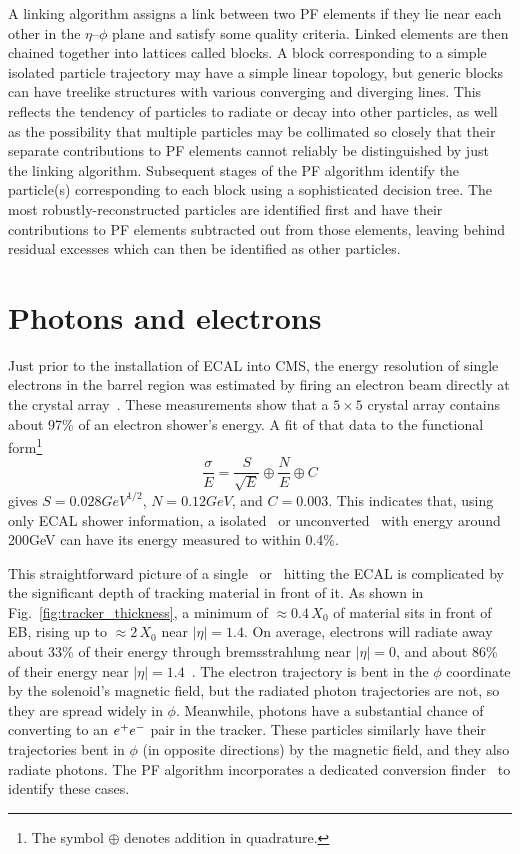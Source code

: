 \documentclass[oneside, letterpaper, 12pt, oldfontcommands]{memoir}
\begin{document}
A linking algorithm assigns a link between two PF elements if they lie near each other in the $\eta$--$\phi$ plane and satisfy some quality criteria.
Linked elements are then chained together into lattices called blocks. A block corresponding to a simple isolated particle trajectory
may have a simple linear topology, but generic blocks can have treelike structures with various converging and diverging lines.
This reflects the tendency of particles to radiate or decay into other
particles, as well as the possibility that multiple particles may be collimated so closely that their separate contributions to PF elements cannot
reliably be distinguished by just the linking algorithm. Subsequent stages of the PF algorithm identify the particle(s) corresponding to each
block using a sophisticated decision tree. The most robustly-reconstructed particles are identified first and have their contributions to PF elements
subtracted out from those elements, leaving behind residual excesses which can then be identified as other particles.

\section{Photons and electrons} \label{sec:reconstruction_egamma}
Just prior to the installation of ECAL into CMS, the energy resolution of single electrons in the barrel region was estimated
by firing an electron beam directly at the crystal array~\cite{ref:1748-0221/2/04/P04004}.
These measurements show that a $5{\times}5$ crystal array contains about 97\% of an electron shower's energy.
A fit of that data to the functional form\footnote{The symbol ${\oplus}$ denotes addition in quadrature.}
\begin{equation}
\frac{\sigma}{E} = \frac{S}{\sqrt{E}} \oplus \frac{N}{E} \oplus C
\end{equation}
gives $S = 0.028\unit{GeV^{1/2}}$, $N = 0.12\unit{GeV}$, and $C = 0.003$. This indicates that, using
only ECAL shower information, a isolated \Pe\ or unconverted \Pgamma\ with energy around 200\unit{GeV} can have its energy measured to within 0.4\%.

This straightforward picture of a single \Pe\ or \Pgamma\ hitting the ECAL is complicated by the significant depth of tracking material in front of it.
As shown in Fig.~\ref{fig:tracker_thickness}, a minimum of ${\approx}0.4$\,$X_{0}$ of material sits in front of EB, rising up to ${\approx}2$\,$X_{0}$ near $|\eta| = 1.4$.
On average, electrons will radiate away about 33\% of their energy through bremsstrahlung near $|\eta| = 0$, and about 86\% of their energy near $|\eta| = 1.4$~\cite{ref:1748-0221/10/06/P06005}.
The electron trajectory is bent in the $\phi$ coordinate by the solenoid's magnetic field, but the radiated photon trajectories are not, so they are spread widely in $\phi$.
Meanwhile, photons have a substantial chance of converting to an $e^{+}e^{-}$ pair in the tracker. These particles similarly have their trajectories bent in $\phi$ (in opposite directions)
by the magnetic field, and they also radiate photons. The PF algorithm incorporates a dedicated conversion finder~\cite{ref:1748-0221/10/08/P08010} to identify these cases.
\end{document}
